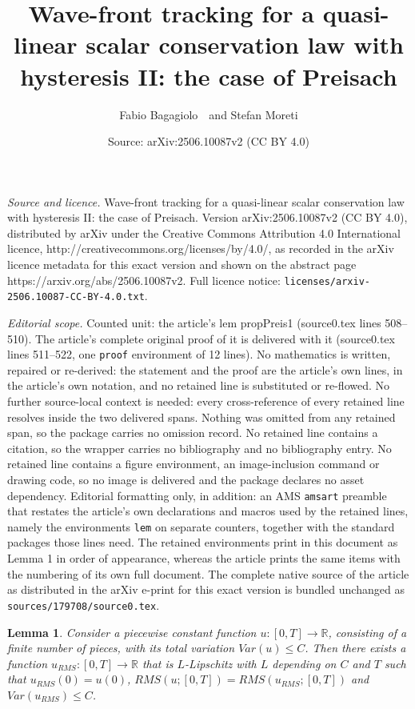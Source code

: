 \documentclass[10pt,a4paper]{amsart}
\title{Wave-front tracking for a quasi-linear scalar conservation law with hysteresis II: the case of Preisach}
\author{Fabio Bagagiolo\ \ and Stefan Moreti}
\date{Source: arXiv:2506.10087v2 (CC BY 4.0)}
\newtheorem{lem}{Lemma}
\newcommand{\R}{\mathbb{R}}
\begin{document}
\maketitle

\noindent\emph{Source and licence.} Wave-front tracking for a quasi-linear scalar conservation law with hysteresis II: the case of Preisach. Version arXiv:2506.10087v2 (CC BY 4.0), distributed by arXiv under the Creative Commons Attribution 4.0 International licence, http://creativecommons.org/licenses/by/4.0/, as recorded in the arXiv licence metadata for this exact version and shown on the abstract page https://arxiv.org/abs/2506.10087v2. Full licence notice: \texttt{licenses/arxiv-2506.10087-CC-BY-4.0.txt}.\par\smallskip

\noindent\textit{Editorial scope.} Counted unit: the article's lem propPreis1 (source0.tex lines 508--510). The article's complete original proof of it is delivered with it (source0.tex lines 511--522, one \texttt{proof} environment of 12 lines). No mathematics is written, repaired or re-derived: the statement and the proof are the article's own lines, in the article's own notation, and no retained line is substituted or re-flowed.  No further source-local context is needed: every cross-reference of every retained line resolves inside the two delivered spans.  Nothing was omitted from any retained span, so the package carries no omission record.  No retained line contains a citation, so the wrapper carries no bibliography and no bibliography entry.  No retained line contains a figure environment, an image-inclusion command or drawing code, so no image is delivered and the package declares no asset dependency.  Editorial formatting only, in addition: an AMS \texttt{amsart} preamble that restates the article's own declarations and macros used by the retained lines, namely the environments \texttt{lem} on separate counters, together with the standard packages those lines need.  The retained environments print in this document as Lemma 1 in order of appearance, whereas the article prints the same items with the numbering of its own full document.  The complete native source of the article as distributed in the arXiv e-print for this exact version is bundled unchanged as \texttt{sources/179708/source0.tex}.
\begin{lem}\label{lemma: propPreis1}
    Consider a piecewise constant function $u:[0,T]\to\R$, consisting of a finite number of pieces, with its total variation $Var(u)\leq C$. Then there exists a function $u_{RMS}:[0,T]\to \R$ that is $L$-Lipschitz with $L$ depending on $C$ and $T$ such that $u_{RMS} (0)=u(0)$, $RMS(u;[0,T])=RMS(u_{RMS};[0,T])$ and $Var(u_{RMS})\leq C$.
\end{lem}
\end{document}
